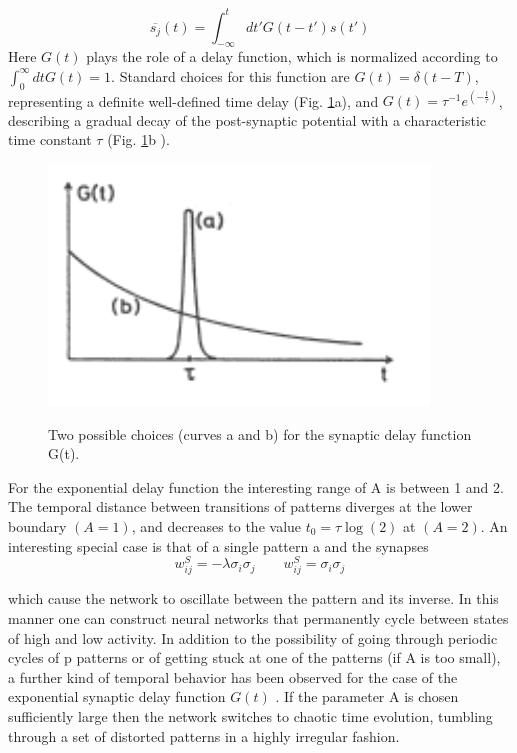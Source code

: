 \begin{equation}
    \overline{s_{j}}(t)=\int_{-\infty}^{t}dt'G(t-t')s(t')
\end{equation}
Here $G(t)$ plays the role of a delay function, which is normalized according
to $\int_{0}^{\infty}dt G(t) = 1$. Standard choices for this function are $G(t) = \delta(t - T)$,
representing a definite well-defined time delay (Fig. \ref{fig:exponential}a), and $G(t) =
\tau^{-1}e^{(-\frac{t}{\tau})}$, describing a gradual decay of the post-synaptic potential with
a characteristic time constant $\tau$ (Fig. \ref{fig:exponential}b ).
 \begin{figure}[h!t]
\centering
{\includegraphics[width=.350\textwidth]{Immagini/exponential.pdf}}
\caption{Two possible choices (curves a and b) for the synaptic delay function G(t).}
\label{fig:exponential}
\end{figure}
For the exponential delay function the interesting range of A is between 1 and 2. The temporal distance between transitions of patterns diverges at the lower boundary $(A = 1)$, and decreases to the value $t_{0} =\tau \log(2)$ at $(A = 2)$. An interesting special case is that of a single pattern a and the synapses
\begin{equation}
    w_{ij}^{S}=-\lambda \sigma_{i}\sigma_{j} \qquad 
    w_{ij}^{S}=\sigma_{i}\sigma_{j}
\end{equation}

which cause the network to oscillate between the pattern and its inverse.
In this manner one can construct neural networks that permanently cycle between states of high and low activity. In addition to the possibility of going through periodic cycles of p patterns or of getting stuck at one of the patterns (if A is too small), a further kind of temporal behavior has been observed for the case of the exponential synaptic delay function $G(t)$ . If the parameter A is chosen sufficiently large then the network switches to chaotic time evolution, tumbling through a set of distorted patterns in a highly irregular fashion.

